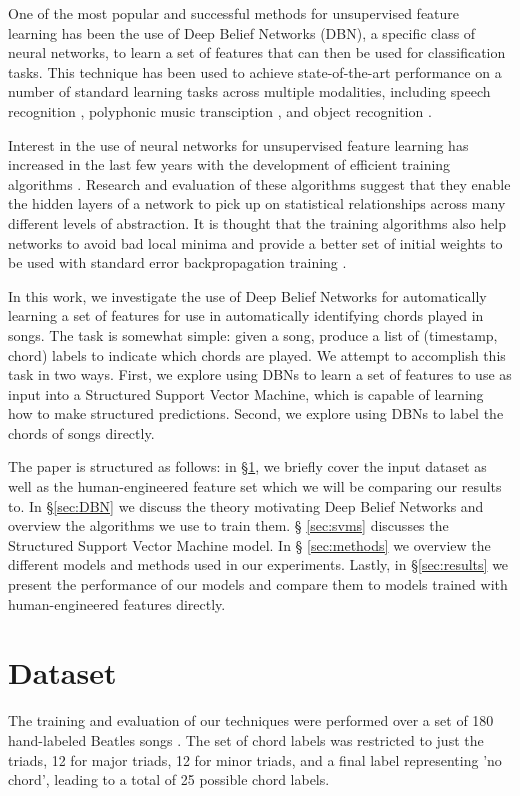 \documentclass{article}
\begin{document}
One of the most popular and successful methods for unsupervised feature
learning has been the use of Deep Belief Networks (DBN), a specific class of
neural networks, to learn a set of features that can then be used for
classification tasks. This technique has been used to achieve state-of-the-art
performance on a number of standard learning tasks across multiple modalities,
including speech recognition \cite{Mohamed_acousticmodeling, dahl2010phone},
polyphonic music transciption \cite{boulanger2012modeling}, and object
recognition \cite{krizhevsky2012imagenet, ciresan2012multi, rifai2011manifold}.

Interest in the use of neural networks for unsupervised feature learning has
increased in the last few years with the development of efficient training
algorithms \cite{Hinton06afast}. Research and evaluation of these algorithms
suggest that they enable the hidden layers of a network to pick up on
statistical relationships across many different levels of abstraction. It is
thought that the training algorithms also help networks to avoid bad local
minima and provide a better set of initial weights to be used with standard
error backpropagation training \cite{Bengio_learning}.

In this work, we investigate the use of Deep Belief Networks for automatically
learning a set of features for use in automatically identifying chords played
in songs. The task is somewhat simple: given a song, produce a list of
(timestamp, chord) labels to indicate which chords are played. We attempt to
accomplish this task in two ways. First, we explore using DBNs to learn a set
of features to use as input into a Structured Support Vector Machine, which is
capable of learning how to make structured predictions.  Second, we explore
using DBNs to label the chords of songs directly.

The paper is structured as follows: in \S \ref{sec:dataset}, we briefly cover
the input dataset as well as the human-engineered feature set which we will be
comparing our results to. In \S \ref{sec:DBN} we discuss the theory motivating
Deep Belief Networks and overview the algorithms we use to train them. \S
\ref{sec:svms} discusses the Structured Support Vector Machine model. In \S
\ref{sec:methods} we overview the different models and methods used in our
experiments. Lastly, in \S \ref{sec:results} we present the performance of our
models and compare them to models trained with human-engineered features
directly.


\section{Dataset} 
\label{sec:dataset}
The training and evaluation of our techniques were performed over a set of 180
hand-labeled Beatles songs \cite{harte2010towards}. The set of chord labels
was restricted to just the triads, 12 for major triads, 12 for minor triads,
and a final label representing 'no chord', leading to a total of 25 possible
chord labels.
\end{document}
